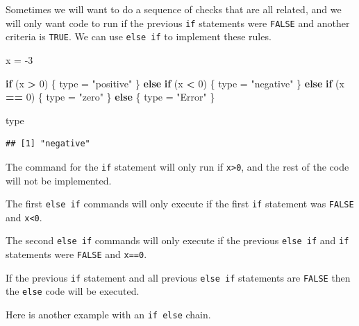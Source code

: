 \documentclass[
]{book}
\newenvironment{Shaded}{\begin{snugshade}}{\end{snugshade}}
\newcommand{\ControlFlowTok}[1]{\textcolor[rgb]{0.13,0.29,0.53}{\textbf{#1}}}
\newcommand{\DecValTok}[1]{\textcolor[rgb]{0.00,0.00,0.81}{#1}}
\newcommand{\NormalTok}[1]{#1}
\newcommand{\OperatorTok}[1]{\textcolor[rgb]{0.81,0.36,0.00}{\textbf{#1}}}
\newcommand{\StringTok}[1]{\textcolor[rgb]{0.31,0.60,0.02}{#1}}
\begin{document}
Sometimes we will want to do a sequence of checks that are all related, and we will only want code to run if the previous \texttt{if} statements were \texttt{FALSE} and another criteria is \texttt{TRUE}. We can use \texttt{else\ if} to implement these rules.

\begin{Shaded}
\begin{Highlighting}[]
\NormalTok{x =}\StringTok{ }\DecValTok{-3}


\ControlFlowTok{if}\NormalTok{ (x }\OperatorTok{>}\StringTok{ }\DecValTok{0}\NormalTok{) \{}
\NormalTok{    type =}\StringTok{ "positive"}
\NormalTok{\} }\ControlFlowTok{else} \ControlFlowTok{if}\NormalTok{ (x }\OperatorTok{<}\StringTok{ }\DecValTok{0}\NormalTok{) \{}
\NormalTok{    type =}\StringTok{ "negative"}
\NormalTok{\} }\ControlFlowTok{else} \ControlFlowTok{if}\NormalTok{ (x }\OperatorTok{==}\StringTok{ }\DecValTok{0}\NormalTok{) \{}
\NormalTok{    type =}\StringTok{ "zero"}
\NormalTok{\} }\ControlFlowTok{else}\NormalTok{ \{}
\NormalTok{    type =}\StringTok{ "Error"}
\NormalTok{\}}

\NormalTok{type}
\end{Highlighting}
\end{Shaded}

\begin{verbatim}
## [1] "negative"
\end{verbatim}

The command for the \texttt{if} statement will only run if \texttt{x\textgreater{}0}, and the rest of the code will not be implemented.

The first \texttt{else\ if} commands will only execute if the first \texttt{if} statement was \texttt{FALSE} and \texttt{x\textless{}0}.

The second \texttt{else\ if} commands will only execute if the previous \texttt{else\ if} and \texttt{if} statements were \texttt{FALSE} and \texttt{x==0}.

If the previous \texttt{if} statement and all previous \texttt{else\ if} statements are \texttt{FALSE} then the \texttt{else} code will be executed.

Here is another example with an \texttt{if\ else} chain.
\end{document}
